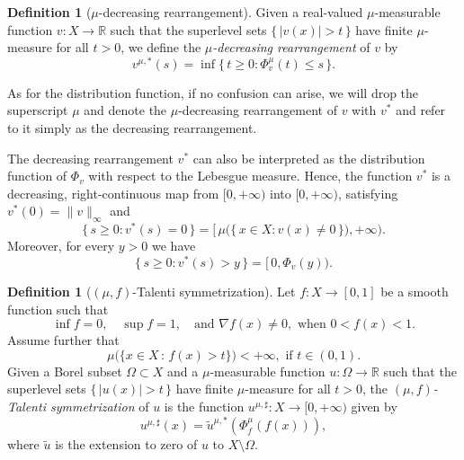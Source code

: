 \documentclass[a4paper,12pt,reqno]{amsart}
\numberwithin{equation}{section}
\newcommand{\R}{\mathbb{R}}
\theoremstyle{plain}
\theoremstyle{definition}
\newtheorem{definition}[theorem]{Definition}
\begin{document}
\begin{definition}[$\mu$-decreasing rearrangement]
\label{def:d-rearrangement}
%
Given a real-valued $\mu$-mea\-sur\-able function $v:X \to \R$ such that the superlevel sets $\{\,|v(x)|>t\,\}$ have finite $\mu$-measure for all $t>0$, we define the \emph{$\mu$-decreasing rearrangement} of $v$ by
%
\begin{equation}
\label{eq:decreasing-rearrangement}
v^{\mu,*}(s)=\inf\{\,t \geq 0 : \Phi_v^\mu(t)\leq s\,\}.
\end{equation}
%
\end{definition}

As for the distribution function, if no confusion can arise, we will drop the superscript $\mu$ and denote the $\mu$-decreasing rearrangement of $v$ with $v^*$ and refer to it simply as the decreasing rearrangement.

The decreasing rearrangement $v^*$ can also be interpreted as the distribution function of $\Phi_v$ with respect to the Lebesgue measure. Hence, the function $v^*$ is a decreasing, right-continuous map from $[0,+\infty)$ into $[0,+\infty)$, satisfying $v^*(0)=\|v\|_\infty$ and
\[
\{\, s\geq 0 : v^*(s)=0\,\}=\bigl[\,\mu\bigl(\{\,x \in X: v(x)\neq0\,\}\bigr),+\infty\bigr).
\]
Moreover, for every $y>0$ we have
%
\begin{equation}
\label{eq:superlevelsets-v*}
\{\, s\geq 0 : v^*(s)>y\,\}=[\,0,\Phi_v(y)).
\end{equation}
%

\begin{definition}[$(\mu,f)$-Talenti symmetrization] \label{def:talenti}
%
Let $f:X\to[0,1]$ be a smooth function such that
%
\begin{equation}
\label{eq:hp-f-talenti}
\tag{H1}
\inf f=0,
\quad 
\sup f=1, 
\quad
\text{and }
\nabla f(x)\neq 0,
\text{ when $0<f(x)<1$}.
\end{equation}
%
Assume further that
%
\begin{equation}
\label{eq:hp-f-mu-talenti}
\tag{H2}
\mu\bigl(\{x\in X\,:\, f(x)>t\}\bigr) < +\infty,
\text{ if $t\in(0,1)$.}
\end{equation}
%
Given a Borel subset $\Omega\subset X$ and a $\mu$-measurable function $u:\Omega \to \R$ such that the superlevel sets $\{\,|u(x)|>t\,\}$ have finite $\mu$-measure for all $t>0$, the \emph{$(\mu,f)$-Talenti symmetrization} of $u$ is the function $u^{\mu,\sharp}:X\to[0,+\infty)$ given by
%
\begin{equation}
\label{eq:def-symmetrized}
u^{\mu,\sharp}(x)=\tilde{u}^{\mu,*}(\Phi^\mu_f(f(x))),
\end{equation}
%
where $\tilde{u}$ is the extension to zero of $u$ to $X\setminus\Omega$.
\end{definition}
\end{document}
